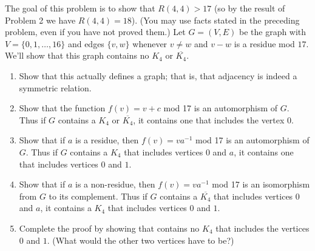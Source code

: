 \documentclass[12pt,letterpaper]{hmcpset}
\begin{document}
\begin{problem}[5]
    The goal of this problem is to show that $R(4,4)>17$ (so by the result of Problem  2 we have $R(4,4)=18$).  (You may use facts stated in the preceding problem, even if you have not proved them.) Let $G=(V,E)$ be the graph with $V=\{0,1,\ldots, 16\}$ and edges $\{v,w\}$ whenever $v\not=w$ and $v-w$ is a residue mod $17$.  We'll show that this graph contains no $K_4$ or $\overline{K_4}$.
    \begin{enumerate}
        \item Show that this actually defines a graph; that is, that adjacency is indeed a symmetric relation. 
        \item Show that the function $f(v) = v+c$ mod 17 is an automorphism of $G$. Thus if $G$ contains a $K_4$ or $\overline{K_4}$, it contains one that includes the vertex $0$.
        \item Show that if $a$ is a residue, then $f(v) = va^{-1}$ mod 17 is an automorphism of $G$.  Thus if $G$ contains a $K_4$ that includes vertices $0$ and $a$, it contains one that includes vertices $0$ and $1$.
        \item Show that if $a$ is a non-residue, then $f(v) = va^{-1}$ mod 17 is an isomorphism from $G$ to its complement.  Thus if $G$ contains a $\overline{K_4}$ that includes vertices $0$ and $a$, it contains a $K_4$ that includes vertices $0$ and $1$.
        \item Complete the proof by showing that contains no $K_4$ that includes the vertices $0$ and $1$.  (What would the other two vertices have to be?)
    \end{enumerate}
\end{problem}
\begin{solution}
    \vfill
\end{solution}
\end{document}
